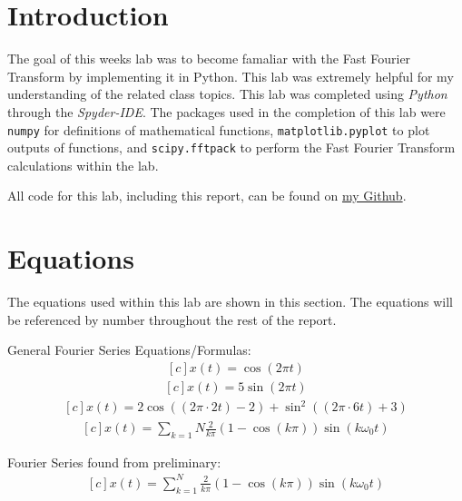 \documentclass[12pt]{report}
\begin{document}
\section{Introduction}
The goal of this weeks lab was to become famaliar with the Fast Fourier Transform by implementing it in Python.
This lab was extremely helpful for my understanding of the related class topics. This lab was completed using 
\textit{Python} through the \textit{Spyder-IDE}. The packages used in the completion of this lab were 
\texttt{numpy} for definitions of mathematical functions, \texttt{matplotlib.pyplot} to plot outputs 
of functions, and \texttt{scipy.fftpack} to perform the Fast Fourier Transform calculations within the lab.

All code for this lab, including this report, can be found on \href{http://github.com/mac-edmondson}{my Github}.
\section{Equations}\label{section: eq}
The equations used within this lab are shown in this section. The equations will be referenced by number throughout
the rest of the report.

General Fourier Series Equations/Formulas:
\begin{equation}\label{eq: 1} %
  \begin{aligned}[c]
    x(t) = \cos{(2\pi t)}
  \end{aligned}
\end{equation}
\begin{equation}\label{eq: 2}
  \begin{aligned}[c]
    x(t) = 5\sin{(2\pi t)}
  \end{aligned}
\end{equation}
\begin{equation}\label{eq: 3}
  \begin{aligned}[c]
    x(t) = 2 \cos{((2\pi \cdot 2t)-2)} + \sin^2{((2\pi\cdot 6t)+3)}
  \end{aligned}
\end{equation}
\begin{equation}\label{eq: 4}
  \begin{aligned}[c]
    x(t) = \sum_{k=1}{N}\frac{2}{k\pi}(1 - \cos{(k\pi)})\sin{(k\omega_0 t)}
  \end{aligned}
\end{equation}

Fourier Series found from preliminary:
\begin{equation}\label{eq: plfs} %
  \begin{aligned}[c]
    x(t) = \sum_{k=1}^{N}{\frac{2}{k\pi}(1 - \cos(k \pi))\sin(k\omega_0t)}
  \end{aligned}
\end{equation}
\end{document}
